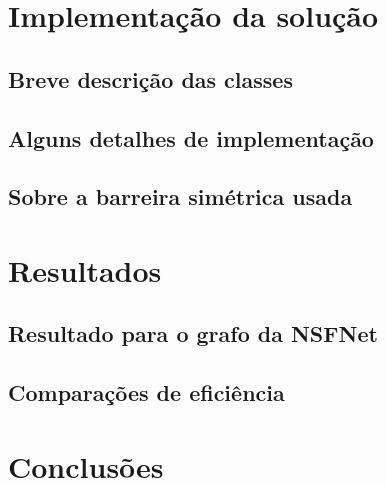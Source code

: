\documentclass[a4paper,11pt]{article}
\begin{document}
\section{Implementação da solução}

  \subsection{Breve descrição das classes}

  \subsection{Alguns detalhes de implementação}

  \subsection{Sobre a barreira simétrica usada}

\section{Resultados}

  \subsection{Resultado para o grafo da NSFNet}

  \subsection{Comparações de eficiência}

\section{Conclusões}
\end{document}

